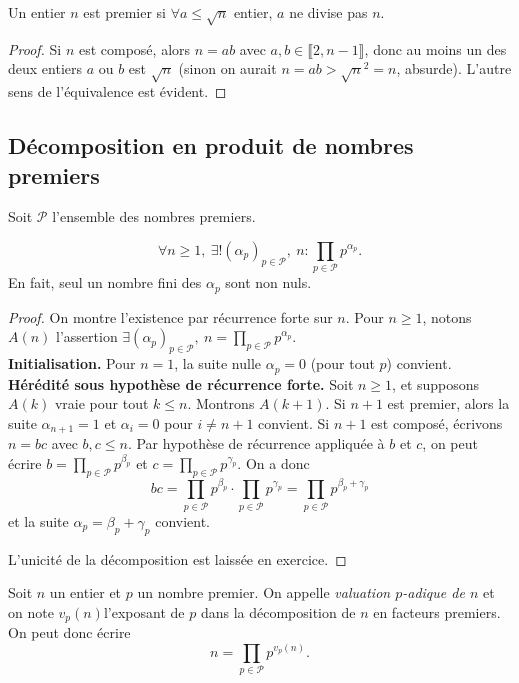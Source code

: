 \begin{proposition}
Un entier $n$ est premier si $\forall a \leq \sqrt n$ entier, $a$ ne divise pas $n$.
\end{proposition}
\begin{proof}
Si $n$ est composé, alors $n=ab$ avec $a, b \in \llbracket 2,n-1 \rrbracket$, donc au moins un des deux entiers $a$ ou $b$ est $\sqrt n$ (sinon on aurait $n=ab > \sqrt{n}^2=n$, absurde). L'autre sens de l'équivalence est évident.
\end{proof}



\subsection{Décomposition en produit de nombres premiers}
Soit $\mathcal P$ l'ensemble des nombres premiers.

\begin{proposition}
\[
\forall n\geq 1, \: \exists !  (\alpha_p)_{p\in \mathcal P}, \: n : \prod_{p\in \mathcal P} p^{\alpha_p}.
\]
En fait, seul un nombre fini des $\alpha_p$ sont non nuls.
\end{proposition}
\begin{proof}
On montre l'existence par récurrence forte sur $n$. Pour $n\geq 1$, notons $A(n)$ l'assertion  $\exists  (\alpha_p)_{p\in \mathcal P}, \: n = \prod_{p\in \mathcal P} p^{\alpha_p}$.\\

\textbf{Initialisation.} Pour $n=1$, la suite nulle $\alpha_p = 0$ (pour tout $p$) convient.\\

\textbf{Hérédité sous hypothèse de récurrence forte.} Soit $n\geq 1$, et supposons $A(k)$ vraie pour tout $k\leq n$. Montrons $A(k+1)$. Si $n+1$ est premier, alors la suite $\alpha_{n+1}=1$ et $\alpha_i=0$ pour $i\neq n+1$ convient. Si $n+1$ est composé, écrivons $n=bc$ avec $b,c\leq n$. Par hypothèse de récurrence appliquée à $b$ et $c$, on peut écrire $b=\prod_{p\in \mathcal P} p^{\beta_p}$ et $c=\prod_{p\in \mathcal P} p^{\gamma_p}$. On a donc 
\[ bc = \prod_{p\in \mathcal P} p^{\beta_p} \cdot \prod_{p\in \mathcal P} p^{\gamma_p}
= \prod_{p\in \mathcal P} p^{\beta_p+\gamma_p}\] et la suite $\alpha_p = \beta_p+\gamma_p$ convient.

L'unicité de la décomposition est laissée en exercice.
\end{proof}

\begin{definition}
Soit $n$ un entier et $p$ un nombre premier. On appelle \emph{valuation $p$-adique de $n$} et on note $v_p(n)$l'exposant de $p$ dans la décomposition de $n$ en facteurs premiers. On peut donc écrire 
\[ n = \prod_{p\in \mathcal P} p^{v_p(n)}.\]
\end{definition}

